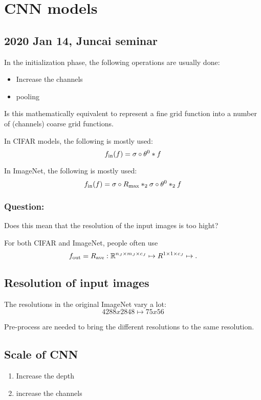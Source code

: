 
\section{CNN models}

\subsection{2020 Jan 14, Juncai seminar}
In the initialization phase,  the following operations are usually
done:
\begin{itemize}
\item Increase the channels
\item pooling
\end{itemize}
Is this mathematically equivalent to represent a fine grid function
into a number of (channels) coarse grid functions.

In CIFAR models, the following is mostly used:
$$
f_{\rm in}(f)=\sigma\circ\theta^0\ast f
$$

In ImageNet, the following is mostly used:
$$
f_{\rm in}(f)=\sigma \circ R_{\max} \ast_2 \sigma \circ \theta^0 \ast_2 f
$$

\subsubsection*{Question:}  Does this mean that the resolution of the
input images is too hight?

For both CIFAR and ImageNet, people often use
\begin{equation}
  \label{f-out}
f_{\rm out}=R_{\rm ave}:  \mathbb R^{n_J\times m_J\times c_J}\mapsto 
R^{1\times 1\times c_J}\mapsto. 
\end{equation}

\subsection{Resolution of input images}
The resolutions in the original ImageNet vary a lot:
$$
4288x2848 \mapsto 75x56
$$

Pre-process are needed to bring the different resolutions to the same
resolution. 

\subsection{Scale of CNN}
\begin{enumerate}
\item Increase the depth
\item increase the channels
\end{enumerate}

